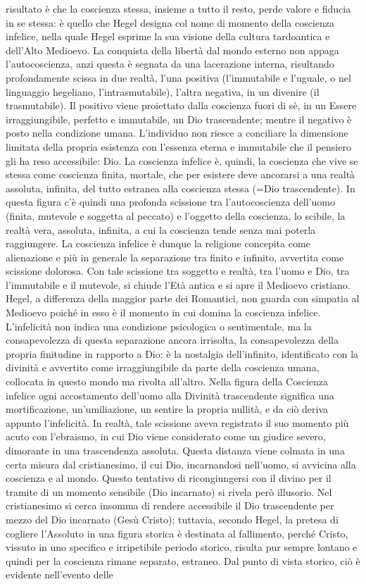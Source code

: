 \documentclass[a4paper,12pt,oneside,openany]{book}%
\begin{document}
risultato è che la coscienza stessa, insieme a tutto il resto, perde valore e fiducia in se stessa: è quello che Hegel designa col nome di momento della coscienza infelice, nella quale Hegel esprime la sua visione della cultura tardoantica e dell’Alto Medioevo. La conquista della libertà dal mondo esterno non appaga l’autocoscienza, anzi questa è segnata da una lacerazione interna, risultando profondamente scissa in due realtà, l’una positiva (l’immutabile e l’uguale, o nel linguaggio hegeliano, l’intrasmutabile), l’altra negativa, in un divenire (il trasmutabile). Il positivo viene proiettato dalla coscienza fuori di sè, in un Essere irraggiungibile, perfetto e immutabile, un Dio trascendente; mentre il negativo è posto nella condizione umana. L’individuo non riesce a conciliare la dimensione limitata della propria esistenza con l’essenza eterna e immutabile che il pensiero gli ha reso accessibile: Dio. La coscienza infelice è, quindi, la coscienza che vive se stessa come coscienza finita, mortale, che per esistere deve ancorarsi a una realtà assoluta, infinita, del tutto estranea alla coscienza stessa (=Dio trascendente). In questa figura c’è quindi una profonda scissione tra l’autocoscienza dell’uomo (finita, mutevole e soggetta al peccato) e l’oggetto della coscienza, lo scibile, la realtà vera, assoluta, infinita, a cui la coscienza tende senza mai poterla raggiungere. La coscienza infelice è dunque la religione concepita come alienazione e più in generale la separazione tra finito e infinito, avvertita come scissione dolorosa. Con tale scissione tra soggetto e realtà, tra l’uomo e Dio, tra l’immutabile e il mutevole, si chiude l’Età antica e si apre il Medioevo cristiano. Hegel, a differenza della maggior parte dei Romantici, non guarda con simpatia al Medioevo poiché in esso è il momento in cui domina la coscienza infelice. L’infelicità non indica una condizione psicologica o sentimentale, ma la consapevolezza di questa separazione ancora irrisolta, la consapevolezza della propria finitudine in rapporto a Dio: è la nostalgia dell’infinito, identificato con la divinità e avvertito come irraggiungibile da parte della coscienza umana, collocata in questo  mondo ma rivolta all’altro. Nella figura della Coscienza infelice ogni accostamento dell’uomo alla Divinità trascendente significa una mortificazione, un’umiliazione, un sentire la propria nullità, e da ciò deriva appunto l’infelicità. In realtà, tale scissione aveva registrato il suo momento più acuto con l’ebraismo, in cui Dio viene considerato come un giudice severo, dimorante in una trascendenza assoluta. Questa distanza viene colmata in una certa misura dal cristianesimo, il cui Dio, incarnandosi nell’uomo, si avvicina alla coscienza e al mondo. Questo tentativo di ricongiungersi con il divino per il tramite di un momento sensibile (Dio incarnato) si rivela però illusorio. Nel cristianesimo si cerca insomma di rendere accessibile il Dio trascendente per mezzo del Dio incarnato (Gesù Cristo); tuttavia, secondo Hegel, la pretesa di cogliere l’Assoluto in una figura storica è destinata al fallimento, perché Cristo, vissuto in uno specifico e irripetibile periodo storico, risulta pur sempre lontano e quindi per la coscienza rimane separato, estraneo. Dal punto di vista storico, ciò è evidente nell’evento delle 
\end{document}
